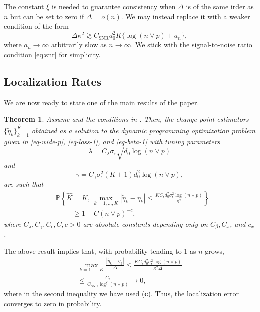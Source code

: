 \documentclass[twoside]{article}
\newtheorem{theorem}{Theorem}
\begin{document}
The constant $\xi$ is needed to guarantee consistency when $\Delta$ is of the same irder as $n$ but  can be set to zero if $\Delta = o(n)$.  We may instead replace it with a weaker condition of the form
	\[
		\Delta \kappa^2 \gtrsim C_{\mathrm{SNR}} d_0^2 K \{\log(n \vee p) + a_n\},
	\]
	where $a_n \to \infty$ arbitrarily slow as $n \to \infty$.  We stick with the signal-to-noise ratio condition \eqref{eq:snr} for simplicity.

\subsection{Localization Rates}\label{sec-local-rates}
We are now ready to state one of the main results of the paper.

\begin{theorem}\label{eq:DP consistent for regression}
Assume  and the conditions in  . Then,
the change point estimators $\{\widetilde{\eta}_k\}_{k = 1}^{\widehat{K}}$ obtained as a solution to the dynamic programming optimization problem given in \eqref{eq-wide-p}, \eqref{eq-loss-1}, and \eqref{eq-beta-1}  with tuning parameters
	\[
		\lambda = C_{\lambda}\sigma_{\varepsilon} \sqrt{d_0 \log(n \vee p)}
	\]
	and
	\[
		\gamma = C_{\gamma}\sigma_{\epsilon}^2 (K+1) d^2_0 \log(n \vee p),
	\]
	are such that
	\begin{align}\label{eq-lm-thm-1}
		& \mathbb{P}\left\{\widehat K = K, \, \max_{k = 1, \ldots, K}|\widetilde{\eta}_k - \eta_k| \leq  \frac{KC_{\epsilon}d_0^2 \sigma^2_{\epsilon} \log(n \vee p)}{\kappa^2} \right\} \nonumber\\ 
		& \hspace{1cm}\geq 1 - C(n \vee p)^{-c},
	\end{align}
	where $C_{\lambda}, C_{\gamma}, C_{\epsilon}, C, c > 0$ are absolute constants depending only on $C_{\beta}, C_x$, and $c_x$.
\end{theorem}


The above result implies that, with probability tending to 1 as $n$ grows,
	\begin{align*}
		\max_{k = 1, \ldots, K}\frac{|\hat{\eta}_k - \eta_k|}{\Delta} \leq \frac{KC_{\epsilon} d^2_0 \sigma^2_{\epsilon}\log(n \vee p)}{\kappa^2 \Delta} \\
		\leq \frac{C_{\epsilon}}{C_{\mathrm{SNR}}\log^{\xi}(n \vee p)} \to 0,
	\end{align*}
	where in the second inequality we have used (\textbf{c}).  Thus, the localization error converges to zero in probability.
	
\end{document}
